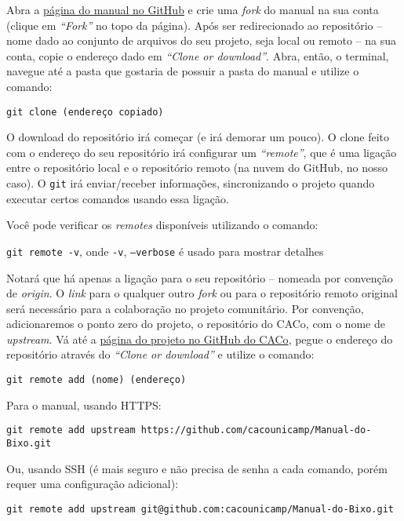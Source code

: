 \documentclass[a4paper,oneside,10pt]{memoir}
\begin{document}
Abra a \href{https://github.com/cacounicamp/Manual-do-Bixo/}{página do manual no
GitHub} e crie uma \emph{fork} do manual na sua conta (clique em \emph{“Fork”}
no topo da página). Após ser redirecionado ao repositório -- nome dado ao
conjunto de arquivos do seu projeto, seja local ou remoto -- na sua conta, copie
o endereço dado em \emph{“Clone or download”}. Abra, então, o terminal, navegue
até a pasta que gostaria de possuir a pasta do manual e utilize o comando:

\begin{center}
\texttt{git clone (endereço copiado)}
\end{center}

O download do repositório irá começar (e irá demorar um pouco). O clone feito
com o endereço do seu repositório irá configurar um \emph{“remote”}, que é uma
ligação entre o repositório local e o repositório remoto (na nuvem do GitHub,
no nosso caso). O \texttt{git} irá enviar/receber informações, sincronizando o
projeto quando executar certos comandos usando essa ligação.

Você pode verificar os \emph{remotes} disponíveis utilizando o comando:
\begin{center}
\texttt{git remote -v}, onde \texttt{-v}, \texttt{--verbose} é usado para
mostrar detalhes
\end{center}

Notará que há apenas a ligação para o seu repositório -- nomeada por conven\-ção
de \emph{origin}. O \emph{link} para o qualquer outro \emph{fork} ou para o
repositório remoto original será necessário para a colaboração no projeto
comunitário. Por convenção, adicionaremos o ponto zero do projeto, o repositório
do CACo, com o nome de \emph{upstream}. Vá até a
\href{https://github.com/cacounicamp/Manual-do-Bixo/}{página do projeto no
GitHub do CACo}, pegue o endereço do repositório através do \emph{“Clone or
download”} e utilize o comando:

\begin{center}
\texttt{git remote add (nome) (endereço)}
\end{center}

\noindent Para o manual, usando HTTPS:
\begin{center}
\texttt{git remote add upstream
https://github.com/cacounicamp/Manual-do-Bixo.git}
\end{center}
Ou, usando SSH (é mais seguro e não precisa de senha a cada comando, porém
requer uma configuração adicional):
\begin{center}
\texttt{git remote add upstream git@github.com:cacounicamp/Manual-do-Bixo.git}
\end{center}
\end{document}
